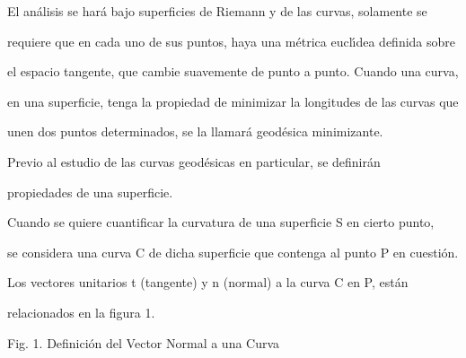 \documentclass[a4paper,portrait,12pt]{article}
\begin{document}
\begin{flushleft}
El análisis se hará bajo superficies de Riemann y de las curvas, solamente se
\end{flushleft}


\begin{flushleft}
requiere que en cada uno de sus puntos, haya una métrica eucl\i{}́dea definida sobre
\end{flushleft}


\begin{flushleft}
el espacio tangente, que cambie suavemente de punto a punto. Cuando una curva,
\end{flushleft}


\begin{flushleft}
en una superficie, tenga la propiedad de minimizar la longitudes de las curvas que
\end{flushleft}


\begin{flushleft}
unen dos puntos determinados, se la llamará geodésica minimizante.
\end{flushleft}


\begin{flushleft}
Previo al estudio de las curvas geodésicas en particular, se definirán
\end{flushleft}


\begin{flushleft}
propiedades de una superficie.
\end{flushleft}


\begin{flushleft}
Cuando se quiere cuantificar la curvatura de una superficie S en cierto punto,
\end{flushleft}


\begin{flushleft}
se considera una curva C de dicha superficie que contenga al punto P en cuestión.
\end{flushleft}


\begin{flushleft}
Los vectores unitarios t (tangente) y n (normal) a la curva C en P, están
\end{flushleft}


\begin{flushleft}
relacionados en la figura 1.
\end{flushleft}





\begin{flushleft}
\newpage
Fig. 1. Definición del Vector Normal a una Curva
\end{flushleft}
\end{document}
